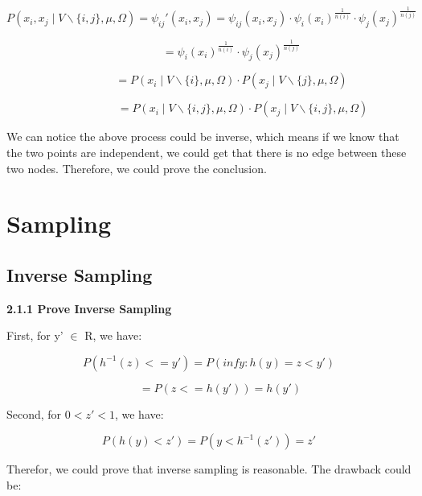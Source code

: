 \documentclass{article} %
\begin{document}
\begin{equation}
P (x_i, x_j \mid V\backslash\{i,j\}, \mu, \Omega) = \psi_{ij}' (x_i, x_j)
= \psi_{ij} (x_i, x_j) \cdot \psi_i (x_i)^{\frac{1}{n(i)}}
\cdot \psi_j (x_j)^{\frac{1}{n(j)}}
\end{equation}

\begin{equation}
\qquad \qquad=
\psi_i (x_i)^{\frac{1}{n(i)}}
\cdot \psi_j (x_j)^{\frac{1}{n(j)}}
\end{equation}

\begin{equation}
\qquad \qquad =
P (x_i\mid V\backslash\{i\}, \mu, \Omega)
\cdot P (x_j\mid V\backslash\{j\}, \mu, \Omega)
\end{equation}

\begin{equation}
\qquad \qquad \qquad =
P (x_i\mid V\backslash\{i,j\}, \mu, \Omega)
\cdot P (x_j\mid V\backslash\{i,j\}, \mu, \Omega)
\end{equation}

We can notice the above process could be inverse, which means if we know that
the two points are independent, we could get that there is no edge between these
two nodes. Therefore, we could prove the conclusion.



\section{Sampling}


\subsection{Inverse Sampling}
\textbf{2.1.1 Prove Inverse Sampling}

First, for y' $\in$ R, we have:

\begin{equation}
P (h^{-1} (z) <= y') = P (inf {y: h(y) = z} < y')
\end{equation}

\begin{equation}
\qquad =
P (z <= h(y')) = h (y')
\end{equation}

Second, for $0 < z'< 1$, we have:

\begin{equation}
P(h(y) < z') = P(y < h^{-1} (z')) = z'
\end{equation}

Therefor, we could prove that inverse sampling is reasonable. The drawback
could be:
\end{document}
